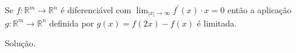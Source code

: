\begin{homeworkProblem}
  Se $f:\mathbb{R}^{m}\to\mathbb{R}^{n}$ é diferenciável com $\displaystyle \lim_{|x| \to \infty}f^{\prime}(x)\cdot x=0$ então a aplicação $g:\mathbb{R}^{m}\to\mathbb{R}^{n}$ definida por $g(x)=f(2x)-f(x)$ é limitada. 
  \begin{solution}
    Solução.
  \end{solution}
\end{homeworkProblem}
